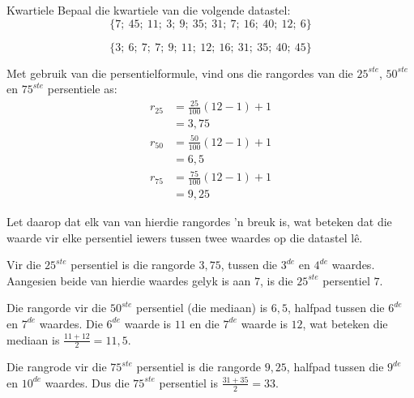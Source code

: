 
\begin{wex}{Kwartiele}
{Bepaal die kwartiele van die volgende datastel:
    \begin{equation*}
      \{7;\ 45;\ 11;\ 3;\ 9;\ 35;\ 31;\ 7;\ 16;\ 40;\ 12;\ 6\}
    \end{equation*}
}{
    \begin{equation*}
      \{3;\ 6;\ 7;\ 7;\ 9;\ 11;\ 12;\ 16;\ 31;\ 35;\ 40;\ 45\}
    \end{equation*}


    Met gebruik van die persentielformule, vind ons die rangordes van die $25^{ste}$,
    $50^{ste}$ en $75^{ste}$ persentiele as:
    \begin{align*}
      r_{25} &= \frac{25}{100}\left(12-1\right)+1 \\
            &= 3,75 \\
      r_{50} &= \frac{50}{100}\left(12-1\right)+1 \\
            &= 6,5 \\
      r_{75} &= \frac{75}{100}\left(12-1\right)+1 \\
            &= 9,25
    \end{align*}


    Let daarop dat elk van van hierdie rangordes ’n breuk is, wat beteken dat die waarde vir elke persentiel iewers tussen twee waardes op die datastel lê. 

    Vir die $25^{ste}$ persentiel is die rangorde $3,75$, tussen die $3^{de}$ en $4^{de}$ waardes. Aangesien beide van hierdie waardes gelyk is aan 
    $7$, is die $25^{ste}$ persentiel $7$.

    Die rangorde vir die $50^{ste}$ persentiel (die mediaan) is $6,5$, halfpad tussen die  $6^{de}$ en $7^{de}$ waardes. Die $6^{de}$ waarde is
    $11$ en die $7^{de}$ waarde is $12$, wat beteken die mediaan is
    \(\frac{11+12}{2} = 11,5\).

    Die rangrode vir die $75^{ste}$ persentiel is die rangorde $9,25$, halfpad tussen die
    $9^{de}$ en $10^{de}$ waardes. Dus die $75^{ste}$ persentiel is
    \(\frac{31+35}{2} = 33\).
  }
\end{wex}
